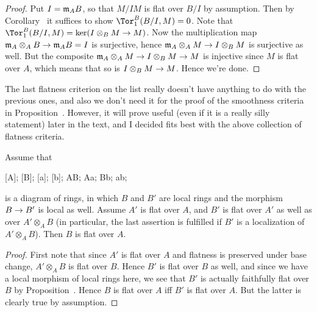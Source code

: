 \documentclass[a4paper,parskip=half,numbers=enddot, DIV=12]{scrreprt}
\begin{document}
\begin{proof}
	Put $I=\mathfrak{m}_AB$, so that $M/IM$ is flat over $B/I$ by assumption. Then by Corollary~ it suffices to show $\Tor_1^B(B/I,M)=0$. Note that $\Tor_1^B(B/I,M)=\ker(I\otimes_BM\morphism M)$. Now the multiplication map $\mm_A\otimes_AB\morphism\mm_AB=I$ is surjective, hence $\mm_A\otimes_AM\morphism I\otimes_BM$ is surjective as well. But the composite $\mm_A\otimes_AM\morphism I\otimes_BM\morphism M$ is injective since $M$ is flat over $A$, which means that so is $I\otimes_BM\morphism M$. Hence we're done.
\end{proof}
The last flatness criterion on the list really doesn't have anything to do with the previous ones, and also we don't need it for the proof of the smoothness criteria in Proposition~. However, it will prove useful (even if it is a really silly statement) later in the text, and I decided fits best with the above collection of flatness criteria.
\begin{lem}
	Assume that
	\begin{diagram*}
		[A];
		[B];
		[a];
		[b];
		\scriptsize
		\arrow AB;
		\arrow Aa;
		\arrow Bb;
		\arrow ab;
	\end{diagram*}
	is a diagram of rings, in which $B$ and $B'$ are local rings and the morphism $B\morphism B'$ is local as well. Assume $A'$ is flat over $A$, and $B'$ is flat over $A'$ as well as over $A'\otimes_AB$ (in particular, the last assertion is fulfilled if $B'$ is a localization of $A'\otimes_AB$). Then $B$ is flat over $A$.
\end{lem}
\begin{proof}
	First note that since $A'$ is flat over $A$ and flatness is preserved under base change, $A'\otimes_AB$ is flat over $B$. Hence $B'$ is flat over $B$ as well, and since we have a local morphism of local rings here, we see that $B'$ is actually faithfully flat over $B$ by Proposition~. Hence $B$ is flat over $A$ iff $B'$ is flat over $A$. But the latter is clearly true by assumption.
\end{proof}
\end{document}
